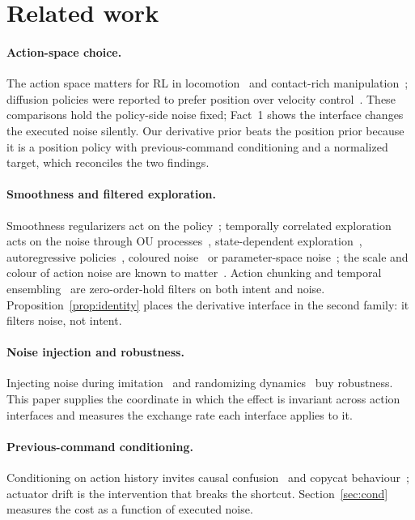 \documentclass{article}
\begin{document}
\section{Related work}

\paragraph{Action-space choice.} The action space matters for RL in locomotion~\citep{peng2017actionspace} and contact-rich manipulation~\citep{martinmartin2019variableimpedance}; diffusion policies were reported to prefer position over velocity control~\citep{chi2023diffusionpolicy}. These comparisons hold the policy-side noise fixed; Fact~1 shows the interface changes the executed noise silently. Our derivative prior beats the position prior because it is a position policy with previous-command conditioning and a normalized target, which reconciles the two findings.

\paragraph{Smoothness and filtered exploration.} Smoothness regularizers act on the policy~\citep{mysore2021caps}; temporally correlated exploration acts on the noise through OU processes~\citep{lillicrap2016ddpg}, state-dependent exploration~\citep{raffin2021smoothexplorationroboticreinforcement}, autoregressive policies~\citep{korenkevych2019autoregressive}, coloured noise~\citep{eberhard2023pink} or parameter-space noise~\citep{plappert2018parameternoise}; the scale and colour of action noise are known to matter~\citep{hollenstein2022actionnoise}. Action chunking and temporal ensembling~\citep{zhao2023act,li2026reinforcementlearningactionchunking} are zero-order-hold filters on both intent and noise. Proposition~\ref{prop:identity} places the derivative interface in the second family: it filters noise, not intent.

\paragraph{Noise injection and robustness.} Injecting noise during imitation~\citep{laskey2017dart} and randomizing dynamics~\citep{peng2018dynamicsrandomization} buy robustness. This paper supplies the coordinate in which the effect is invariant across action interfaces and measures the exchange rate each interface applies to it.

\paragraph{Previous-command conditioning.} Conditioning on action history invites causal confusion~\citep{dehaan2019causalconfusion} and copycat behaviour~\citep{wen2020copycat}; actuator drift is the intervention that breaks the shortcut. Section~\ref{sec:cond} measures the cost as a function of executed noise.
\end{document}
